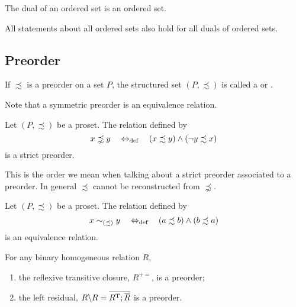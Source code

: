 \begin{lemma}
The dual of an ordered set is an ordered set.
\end{lemma}
\begin{corollary}
All statements about all ordered sets also hold for all duals of ordered sets.
\end{corollary}

\subsection{Preorder}
\begin{definition}
If $\precsim$ is a preorder on a set $P$, the structured set $(P,\precsim)$ is called a  or .
\end{definition}
Note that a symmetric preorder is an equivalence relation.

\begin{lemma}
Let $(P, \precsim)$ be a proset. The relation defined by
\[ x\precnsim y \quad\Leftrightarrow_{\text{def}}\quad (x\precsim y)\land (\neg y\precsim x) \]
is a strict preorder.
\end{lemma}
This is the order we mean when talking about a strict preorder associated to a preorder. In general $\precsim$ cannot be reconstructed from $\precnsim$.

\begin{lemma}
Let $(P, \precsim)$ be a proset. The relation defined by
\[ x \sim_{(\precsim)} y \quad\Leftrightarrow_{\text{def}}\quad (a\precsim b)\land (b\precsim a) \]
is an equivalence relation.
\end{lemma}

\begin{lemma}
For any binary homogeneous relation $R$,
\begin{enumerate}
\item the reflexive transitive closure, $R^{+=}$, is a preorder;
\item the left residual, $R\backslash R = \overline{R^{\mathrm{T}};\overline{R}}$ is a preorder.
\end{enumerate}
\end{lemma}

